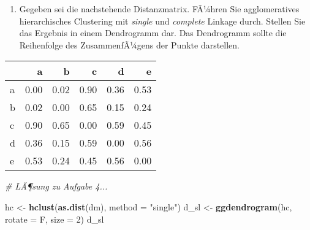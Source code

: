 \documentclass[11pt,]{article}
\newenvironment{Shaded}{\begin{snugshade}}{\end{snugshade}}
\newcommand{\KeywordTok}[1]{\textcolor[rgb]{0.13,0.29,0.53}{\textbf{{#1}}}}
\newcommand{\DataTypeTok}[1]{\textcolor[rgb]{0.13,0.29,0.53}{{#1}}}
\newcommand{\DecValTok}[1]{\textcolor[rgb]{0.00,0.00,0.81}{{#1}}}
\newcommand{\FloatTok}[1]{\textcolor[rgb]{0.00,0.00,0.81}{{#1}}}
\newcommand{\StringTok}[1]{\textcolor[rgb]{0.31,0.60,0.02}{{#1}}}
\newcommand{\CommentTok}[1]{\textcolor[rgb]{0.56,0.35,0.01}{\textit{{#1}}}}
\newcommand{\NormalTok}[1]{{#1}}
\providecommand{\tightlist}{%
  \setlength{\itemsep}{0pt}\setlength{\parskip}{0pt}}
\begin{document}
\begin{enumerate}
\def\labelenumi{\arabic{enumi}.}
\setcounter{enumi}{3}
\tightlist
\item
  Gegeben sei die nachstehende Distanzmatrix. FÃ¼hren Sie agglomeratives
  hierarchisches Clustering mit \emph{single} und \emph{complete}
  Linkage durch. Stellen Sie das Ergebnis in einem Dendrogramm dar. Das
  Dendrogramm sollte die Reihenfolge des ZusammenfÃ¼gens der Punkte
  darstellen.
\end{enumerate}

\begin{Shaded}
\end{Shaded}

\begin{longtable}[]{@{}lrrrrr@{}}
\toprule
& a & b & c & d & e\tabularnewline
\midrule
\endhead
a & 0.00 & 0.02 & 0.90 & 0.36 & 0.53\tabularnewline
b & 0.02 & 0.00 & 0.65 & 0.15 & 0.24\tabularnewline
c & 0.90 & 0.65 & 0.00 & 0.59 & 0.45\tabularnewline
d & 0.36 & 0.15 & 0.59 & 0.00 & 0.56\tabularnewline
e & 0.53 & 0.24 & 0.45 & 0.56 & 0.00\tabularnewline
\bottomrule
\end{longtable}

\begin{Shaded}
\begin{Highlighting}[]
\CommentTok{# LÃ¶sung zu Aufgabe 4...}


\NormalTok{hc <-}\StringTok{ }\KeywordTok{hclust}\NormalTok{(}\KeywordTok{as.dist}\NormalTok{(dm), }\DataTypeTok{method =} \StringTok{"single"}\NormalTok{)}
\NormalTok{d_sl <-}\StringTok{ }\KeywordTok{ggdendrogram}\NormalTok{(hc, }\DataTypeTok{rotate =} \NormalTok{F, }\DataTypeTok{size =} \DecValTok{2}\NormalTok{)}
\NormalTok{d_sl}
\end{Highlighting}
\end{Shaded}
\end{document}
